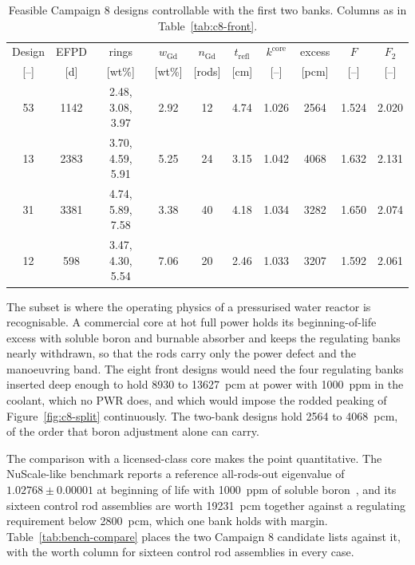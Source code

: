 \begin{table}[htbp]
  \centering
  \small
  \caption[The Campaign 8 two-bank subset]{Feasible Campaign 8 designs controllable with the first two banks. Columns as in Table~\ref{tab:c8-front}.}
  \label{tab:c8-two}
  \setlength{\tabcolsep}{3.8pt}
  \begin{tabular}{cccccccccc}
    \toprule
    Design & EFPD & rings & $w_\mathrm{Gd}$ & $n_\mathrm{Gd}$ &
      $t_\mathrm{refl}$ & $k^\mathrm{core}$ & excess & $F$ & $F_{2}$ \\
    {[--]} & [d] & [wt\%] & [wt\%] & [rods] & [cm] & [--] & [pcm] &
      [--] & [--] \\
    \midrule
    53 & 1142 & 2.48, 3.08, 3.97 & 2.92 & 12 & 4.74 & 1.026 & 2564 & 1.524 & 2.020 \\
    13 & 2383 & 3.70, 4.59, 5.91 & 5.25 & 24 & 3.15 & 1.042 & 4068 & 1.632 & 2.131 \\
    31 & 3381 & 4.74, 5.89, 7.58 & 3.38 & 40 & 4.18 & 1.034 & 3282 & 1.650 & 2.074 \\
    12 &  598 & 3.47, 4.30, 5.54 & 7.06 & 20 & 2.46 & 1.033 & 3207 & 1.592 & 2.061 \\
    \bottomrule
  \end{tabular}
\end{table}

The subset is where the operating physics of a pressurised water
reactor is recognisable. A commercial core at hot full power holds its
beginning-of-life excess with soluble boron and burnable absorber and
keeps the regulating banks nearly withdrawn, so that the rods carry
only the power defect and the manoeuvring band. The eight front
designs would need the four regulating banks inserted deep enough to
hold \num{8930} to \SI{13627}{pcm} at power with \SI{1000}{ppm} in the
coolant, which no PWR does, and which would
impose the rodded peaking of Figure~\ref{fig:c8-split} continuously.
The two-bank designs hold \num{2564} to \SI{4068}{pcm}, of the order
that boron adjustment alone can carry.

The comparison with a licensed-class core makes the point
quantitative. The NuScale-like benchmark reports a reference
all-rods-out eigenvalue of $1.02768 \pm 0.00001$ at beginning of life
with \SI{1000}{ppm} of soluble
boron~\cite{fridman_nuscale_benchmark_2023}, and its sixteen control
rod assemblies are worth \SI{19231}{pcm} together against a regulating
requirement below \SI{2800}{pcm}, which one bank holds with margin.
Table~\ref{tab:bench-compare} places the two Campaign 8 candidate lists
against it, with the worth column for sixteen control rod assemblies in
every case.

